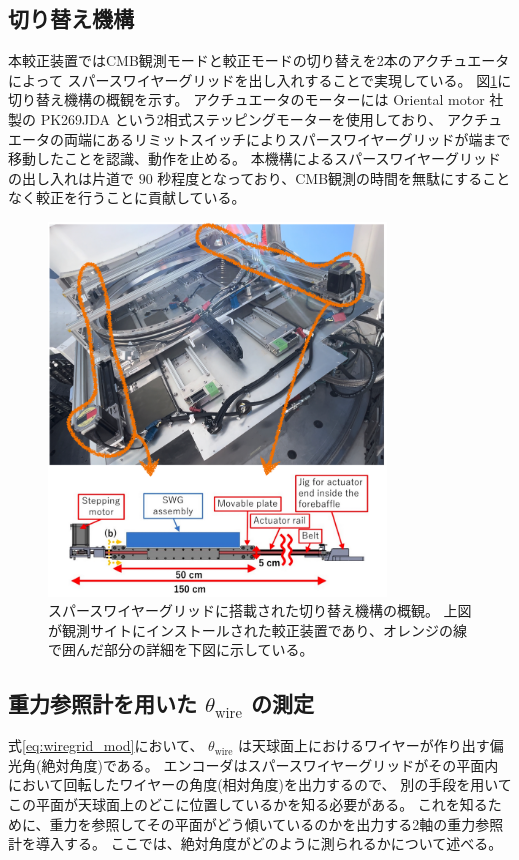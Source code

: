 \documentclass[../../main.tex]{subfiles}
\begin{document}
\subsection{切り替え機構}
本較正装置ではCMB観測モードと較正モードの切り替えを2本のアクチュエータによって
スパースワイヤーグリッドを出し入れすることで実現している。
図\ref{fig:gridloader}に切り替え機構の概観を示す。
アクチュエータのモーターには Oriental motor 社製の PK269JDA という2相式ステッピングモーターを使用しており、
アクチュエータの両端にあるリミットスイッチによりスパースワイヤーグリッドが端まで移動したことを認識、動作を止める。
本機構によるスパースワイヤーグリッドの出し入れは片道で $90$ 秒程度となっており、CMB観測の時間を無駄にすることなく較正を行うことに貢献している\cite{swg:nakata}。
\begin{figure}[H]
    \centering
    \includegraphics[width=0.8\textwidth]{wiregrid/wiregrid_actuator.pdf}
    \caption[スパースワイヤーグリッドに搭載された切り替え機構の概観]{スパースワイヤーグリッドに搭載された切り替え機構の概観。
    上図が観測サイトにインストールされた較正装置であり、オレンジの線で囲んだ部分の詳細を下図に示している。
    }
    \label{fig:gridloader}
\end{figure}
\subsection{重力参照計を用いた $\theta_{\mathrm{wire}}$ の測定}
式\eqref{eq:wiregrid_mod}において、 $\theta_{\mathrm{wire}}$ は天球面上におけるワイヤーが作り出す偏光角(絶対角度)である。
エンコーダはスパースワイヤーグリッドがその平面内において回転したワイヤーの角度(相対角度)を出力するので、
別の手段を用いてこの平面が天球面上のどこに位置しているかを知る必要がある。
これを知るために、重力を参照してその平面がどう傾いているのかを出力する2軸の重力参照計を導入する。
ここでは、絶対角度がどのように測られるかについて述べる。
\end{document}
